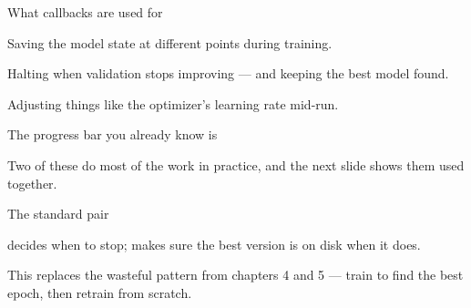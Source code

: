 \documentclass[aspectratio=169,11pt,t]{beamer}
\begin{document}
\begin{frame}[shrink=25]{What callbacks are used for}
\begin{minipage}[t]{0.241\textwidth}
\begin{icard}
Saving the model state at different points during training.
\end{icard}
\end{minipage}%
\hfill
\begin{minipage}[t]{0.241\textwidth}
\begin{icard}
Halting when validation stops improving --- and keeping the best model found.
\end{icard}
\end{minipage}%
\hfill
\begin{minipage}[t]{0.241\textwidth}
\begin{icard}
Adjusting things like the optimizer's learning rate mid-run.
\end{icard}
\end{minipage}%
\hfill
\begin{minipage}[t]{0.241\textwidth}
\begin{icard}
The  progress bar you already know is 
\end{icard}
\end{minipage}%
{\fontsize{9.4}{12.6}\selectfont\color{fg2}Two of these do most of the work in practice, and the next slide shows them used together.\par}\vskip 4pt
\end{frame}

\begin{frame}[shrink=25]{The standard pair}
{\fontsize{9.4}{12.6}\selectfont\color{fg2} decides when to stop;  makes sure the best version is on disk when it does.\par}\vskip 4pt
\begin{iband}[signal]
This replaces the wasteful pattern from chapters 4 and 5 --- train to find the best epoch, then retrain from scratch. 
\end{iband}
\end{frame}
\end{document}
